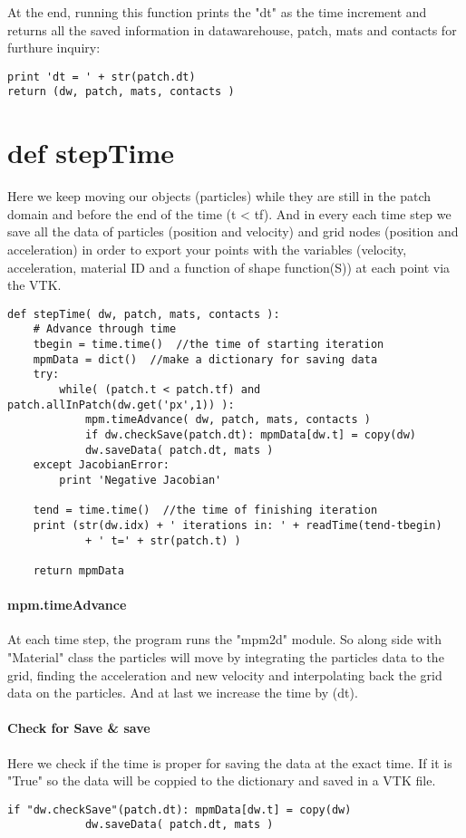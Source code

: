 At the end, running this function prints the "dt" as the time increment and returns all the saved information in datawarehouse, patch, mats and contacts for furthure inquiry:
\begin{lstlisting}
print 'dt = ' + str(patch.dt)        
return (dw, patch, mats, contacts )
\end{lstlisting}


\section{def stepTime}
Here we keep moving our objects (particles) while they are still in the patch domain and before the end of the time (t < tf). And in every each time step we save all the data of particles (position and velocity) and grid nodes (position and acceleration) in order to export your points with the variables (velocity, acceleration, material ID and a function of shape function(S)) at each point via the VTK.

\begin{lstlisting}
def stepTime( dw, patch, mats, contacts ):
    # Advance through time
    tbegin = time.time()  //the time of starting iteration
    mpmData = dict()  //make a dictionary for saving data
    try:
        while( (patch.t < patch.tf) and patch.allInPatch(dw.get('px',1)) ):
            mpm.timeAdvance( dw, patch, mats, contacts )
            if dw.checkSave(patch.dt): mpmData[dw.t] = copy(dw)
            dw.saveData( patch.dt, mats )
    except JacobianError:
        print 'Negative Jacobian'
            
    tend = time.time()  //the time of finishing iteration 
    print (str(dw.idx) + ' iterations in: ' + readTime(tend-tbegin) 
            + ' t=' + str(patch.t) )
            
    return mpmData
\end{lstlisting}
\paragraph{mpm.timeAdvance}
At each time step, the program runs the "mpm2d" module. So along side with "Material" class the particles will move by integrating the particles data to the grid, finding the acceleration and new velocity and interpolating back the grid data on the particles. And at last we increase the time by (dt).
\paragraph{Check for Save \& save}
Here we check if the time is proper for saving the data at the exact time. If it is "True" so the data will be coppied to the  dictionary and saved in a VTK file.
\begin{lstlisting}
if "dw.checkSave"(patch.dt): mpmData[dw.t] = copy(dw)
            dw.saveData( patch.dt, mats )
\end{lstlisting}

